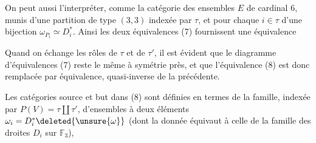 On peut aussi l'interpréter,  comme la catégorie des ensembles $E$ de cardinal $6$, munis d'une partition  de type $(3,3)$ indexée par $\tau$, et pour chaque $i\in\tau$ d'une bijection $\omega_{P_i}\simeq D_i^*$. Ainsi les deux équivalences (7) fournissent une équivalence


Quand  on échange les rôles de $\tau$ et de $\tau'$, il est évident que le diagramme d'équivalences (7) reste le même à symétrie près, et que l'équivalence (8) est donc remplacée par  équivalence,  quasi-inverse de la précédente.

Les catégories source et but dans (8) sont définies en termes de la famille, indexée par $P(V)=\tau\amalg\tau'$, d'ensembles à deux éléments $\omega_i=D_i^*\deleted{\unsure{\omega}}$ (dont la donnée équivaut à celle de la famille des droites  $D_i$ sur $\mathbb F_3$),
